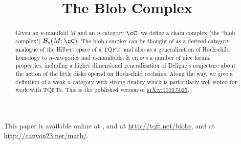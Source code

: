 \documentclass[11pt,leqno]{gtart}
\title{The Blob Complex}
\begin{document}
\makeatletter
{}
\gdef\theequation{\thesection.\arabic{equation}}
\makeatother

\begin{abstract}
Given an $n$-manifold $M$ and an $n$-category $\cC$, we define a chain complex
(the ``blob complex") $\bc_*(M; \cC)$.
The blob complex can be thought of as a derived category analogue of the Hilbert space of a TQFT, 
and also as a generalization of Hochschild homology to $n$-categories and $n$-manifolds.
It enjoys a number of nice formal properties, including a higher dimensional
generalization of Deligne's conjecture about the action of the little disks operad on Hochschild cochains.
Along the way, we give a definition of a weak $n$-category with strong duality which
is particularly well suited for work with TQFTs. This is the published version of \href{http://arxiv.org/abs/1009.5025}{arXiv:1009.5025}.
\end{abstract}


\maketitle



\tableofcontents






















\appendix







%

\newcommand{\urlprefix}{}



This paper is available online at , and at
\url{http://tqft.net/blobs},
and at \url{http://canyon23.net/math/}.

\end{document}
